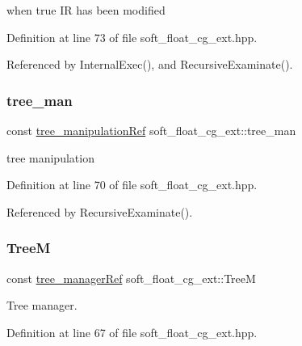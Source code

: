 when true IR has been modified 



Definition at line 73 of file soft\+\_\+float\+\_\+cg\+\_\+ext.\+hpp.



Referenced by Internal\+Exec(), and Recursive\+Examinate().

\mbox{\label{classsoft__float__cg__ext_a7fc1708f8f3bed78162c5c1d5786acaa}} 
\subsubsection{\texorpdfstring{tree\+\_\+man}{tree\_man}}
{\footnotesize\ttfamily const \hyperlink{tree__manipulation_8hpp_a1a9460e3a2f9fc6a96cfd2f24cc9b2a5}{tree\+\_\+manipulation\+Ref} soft\+\_\+float\+\_\+cg\+\_\+ext\+::tree\+\_\+man\hspace{0.3cm}{\ttfamily [protected]}}



tree manipulation 



Definition at line 70 of file soft\+\_\+float\+\_\+cg\+\_\+ext.\+hpp.



Referenced by Recursive\+Examinate().

\mbox{\label{classsoft__float__cg__ext_aeb01b7b86e7e9051d68b32144fdf070d}} 
\subsubsection{\texorpdfstring{TreeM}{TreeM}}
{\footnotesize\ttfamily const \hyperlink{tree__manager_8hpp_a96ff150c071ce11a9a7a1e40590f205e}{tree\+\_\+manager\+Ref} soft\+\_\+float\+\_\+cg\+\_\+ext\+::\+TreeM\hspace{0.3cm}{\ttfamily [protected]}}



Tree manager. 



Definition at line 67 of file soft\+\_\+float\+\_\+cg\+\_\+ext.\+hpp.



